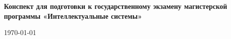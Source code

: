 \documentclass[12pt,a4paper]{article}
\newcommand{\includeticket}[1]{%
    \clearpage
    
}
\begin{document}
\begin{center}
    {\Large\bfseries Конспект для подготовки к государственному экзамену магистерской программы «Интеллектуальные системы»}

    \vspace{0.5em}
    {\normalsize \today}
\end{center}

\tableofcontents
\newpage


\includeticket{02}
\includeticket{03}
\includeticket{04}
\includeticket{05}
\includeticket{06}
\includeticket{07}
\includeticket{08}
\includeticket{09}
\includeticket{10}
\includeticket{11}
\includeticket{12}
\includeticket{13}
\includeticket{14}
\includeticket{15}
\includeticket{16}
\includeticket{17}
\includeticket{18}
\includeticket{19}
\includeticket{20}
\includeticket{21}
\includeticket{22}
\includeticket{23}
\includeticket{24}
\includeticket{25}
\includeticket{26}
\includeticket{27}
\end{document}
